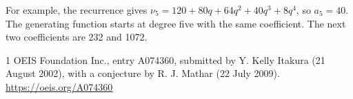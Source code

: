 \documentclass[11pt]{article}
\begin{document}
For example, the recurrence gives \(\nu_5=120+80q+64q^2+40q^3+8q^4\), so \(a_5=40\). The generating function starts at degree five with the same coefficient. The next two coefficients are 232 and 1072.

\begin{thebibliography}{1}
OEIS Foundation Inc., entry A074360, submitted by Y. Kelly Itakura (21 August 2002), with a conjecture by R. J. Mathar (22 July 2009).
\url{https://oeis.org/A074360}
\end{thebibliography}
\end{document}
